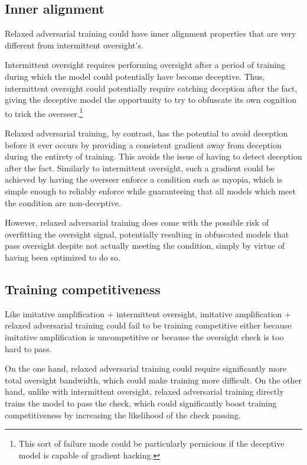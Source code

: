 \documentclass[
  onecolumn,
  natbib,
]{miri-tech-article}
\begin{document}
\subsection{Inner alignment} Relaxed adversarial training could have inner alignment properties that are very different from intermittent oversight's.

Intermittent oversight requires performing oversight after a period of training during which the model could potentially have become deceptive. Thus, intermittent oversight could potentially require catching deception after the fact, giving the deceptive model the opportunity to try to obfuscate its own cognition to trick the overseer.\footnote{This sort of failure mode could be particularly pernicious if the deceptive model is capable of gradient hacking.\cite{gradient_hacking}}

Relaxed adversarial training, by contrast, has the potential to avoid deception before it ever occurs by providing a consistent gradient away from deception during the entirety of training. This avoids the issue of having to detect deception after the fact. Similarly to intermittent oversight, such a gradient could be achieved by having the overseer enforce a condition such as myopia, which is simple enough to reliably enforce while guaranteeing that all models which meet the condition are non-deceptive.

However, relaxed adversarial training does come with the possible risk of overfitting the oversight signal, potentially resulting in obfuscated models that pass oversight despite not actually meeting the condition, simply by virtue of having been optimized to do so.

\subsection{Training competitiveness} Like imitative amplification + intermittent oversight, imitative amplification + relaxed adversarial training could fail to be training competitive either because imitative amplification is uncompetitive or because the oversight check is too hard to pass.

On the one hand, relaxed adversarial training could require significantly more total oversight bandwidth, which could make training more difficult. On the other hand, unlike with intermittent oversight, relaxed adversarial training directly trains the model to pass the check, which could significantly boost training competitiveness by increasing the likelihood of the check passing.
\end{document}
